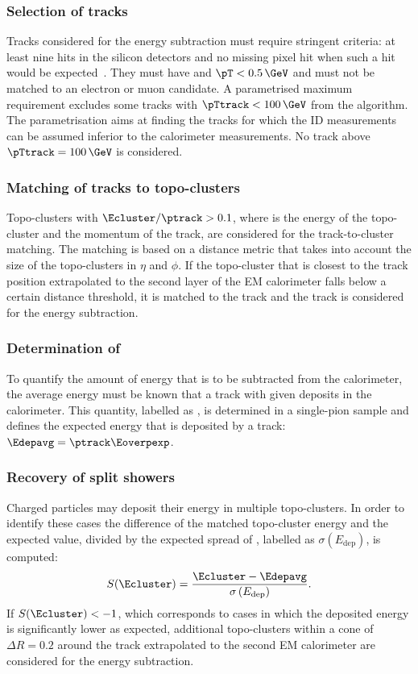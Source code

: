 \subsubsection{Selection of tracks} Tracks considered for the energy subtraction must require stringent criteria: at least nine hits in the silicon detectors and no missing pixel hit when such a hit would be expected~\cite{PERF-2015-09}. They must have  and $\pT < 0.5\,\GeV$ and must not be matched to an electron or muon candidate. A parametrised maximum \pTtrack requirement excludes some tracks with $\pTtrack < 100\,\GeV$ from the algorithm. The parametrisation aims at finding the tracks for which the ID measurements can be assumed inferior to the calorimeter measurements. No track above $\pTtrack = 100\,\GeV$ is considered.

\subsubsection{Matching of tracks to topo-clusters} Topo-clusters with $\Ecluster / \ptrack > 0.1$, where \Ecluster is the energy of the topo-cluster and \ptrack the momentum of the track, are considered for the track-to-cluster matching. The matching is based on a distance metric that takes into account the size of the topo-clusters in $\eta$ and $\phi$. If the topo-cluster that is closest to the track position extrapolated to the second layer of the EM calorimeter falls below a certain distance threshold, it is matched to the track and the track is considered for the energy subtraction.

\subsubsection{Determination of \Eoverpexp} To quantify the amount of energy that is to be subtracted from the calorimeter, the average energy must be known that a track with given \pT deposits in the calorimeter. This quantity, labelled as \Eoverpexp, is determined in a single-pion sample and defines the expected energy that is deposited by a track: $\Edepavg = \ptrack \Eoverpexp$.

\subsubsection{Recovery of split showers} Charged particles may deposit their energy in multiple topo-clusters. In order to identify these cases the difference of the matched topo-cluster energy and the expected value, divided by the expected spread of \Edepavg, labelled as $\sigma \left(E_{\text{dep}}\right)$, is computed:
\begin{equation}
    S(\Ecluster) = \frac{ \Ecluster - \Edepavg}{\sigma \left(E_{\text{dep}}\right)}.
\end{equation}
If $S(\Ecluster)  < -1$, which corresponds to cases in which the deposited energy is significantly lower as expected, additional topo-clusters within a cone of $\Delta R = 0.2$ around the track extrapolated to the second EM calorimeter are considered for the energy subtraction.

